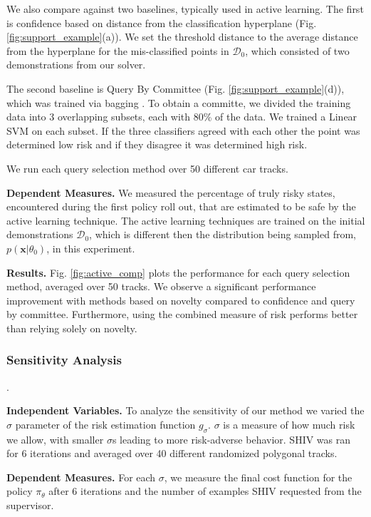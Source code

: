 \documentclass[10pt, conference]{ieeeconf}      %
\newcommand{\bx}{\mathbf{x}}
\begin{document}
We also compare against two baselines, typically used in active learning. The first is confidence based on distance from the classification hyperplane \cite{tong2002support} (Fig. \ref{fig:support_example}(a)). We set the threshold distance to the average distance from the hyperplane for the mis-classified points in $\mathcal{D}_0$, which consisted of two demonstrations from our solver. 

The second baseline is Query By Committee (Fig. \ref{fig:support_example}(d)), which was trained via bagging \cite{breiman1996bagging}.  To obtain a committe, we divided the training data into 3 overlapping subsets, each with 80\% of the data. We trained a Linear SVM on each subset. If the three classifiers agreed with each other the point was determined low risk and if they disagree it was determined high risk. 

We run each query selection method over 50 different car tracks.

\noindent\textbf{Dependent Measures. }We measured the percentage of truly risky states, encountered during the first policy roll out, that  are estimated to be safe by the active learning technique. The active learning techniques are trained on the initial demonstrations $\mathcal{D}_0$, which is different then the distribution being sampled from, $p(\bx|\theta_0)$, in this experiment.

\noindent\textbf{Results. } Fig. \ref{fig:active_comp}  plots the performance for each query selection method, averaged over 50 tracks. We observe a significant performance improvement with methods based on novelty compared to confidence and query by committee. Furthermore, using the combined measure of risk performs better than relying solely on novelty. 

\subsubsection{Sensitivity Analysis}. 

\noindent\textbf{Independent Variables.} To analyze the sensitivity of our method we varied the $\sigma$ parameter of the risk estimation function $g_{\sigma}$. $\sigma$ is a measure of how much risk we allow, with smaller $\sigma$s leading to more risk-adverse behavior. SHIV was ran for 6 iterations and averaged over 40 different randomized polygonal tracks. 

\noindent\textbf{Dependent Measures. } For each  $\sigma$, we measure the final cost function for the policy $\pi_{\theta}$ after 6 iterations and the number of examples SHIV requested from the supervisor. 
\end{document}
